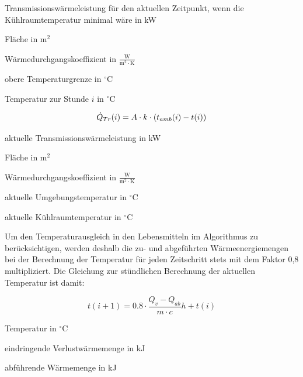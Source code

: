 \begin{description}[\dth]

	\item[$\ptransm(i)$] Transmissionswärmeleistung f\"ur den aktuellen
	Zeitpunkt, wenn die K\"uhlraumtemperatur minimal w\"are in kW
	\item[$A$] Fläche in $\mathrm{m^2}$
	\item[$k$] Wärmedurchgangskoeffizient in $\mathrm{\frac{W}{m^2 \cdot
	K}}$
	\item[$t_{max}$] obere Temperaturgrenze in $ ^{\circ} $C
	\item[$t(i)$] Temperatur zur Stunde $i$ in $ ^{\circ} $C
\end{description}
\vspace{0.5cm}

\begin{equation}
	\ptrans(i) = A \cdot k \cdot \left( t_{amb}(i) -
	t(i) \right)
	\label{ptransi}
\end{equation}

\begin{description}[\dth]

	\item[$\ptrans(i)$] aktuelle Transmissionswärmeleistung in kW
	\item[$A$] Fläche in $\mathrm{m^2}$
	\item[$k$] Wärmedurchgangskoeffizient in $\mathrm{\frac{W}{m^2 \cdot
	K}}$
	\item[$t_{amb}(i)$] aktuelle Umgebungstemperatur in $^{\circ}$C
	\item[$t(i)$] aktuelle Kühlraumtemperatur in $^{\circ}$C
\end{description}
\vspace{0.5cm}

Um den Temperaturausgleich in den Lebensmitteln im Algorithmus zu
berücksichtigen, werden deshalb die zu- und abgeführten Wärmeenergiemengen bei
der Berechnung der Temperatur für jeden Zeitschritt stets mit dem Faktor 0,8
multipliziert.  Die Gleichung zur stündlichen Berechnung der aktuellen
Temperatur ist damit:

\begin{equation}
	t(i+1) = 0.8 \cdot \frac{Q_v - Q_{ab}}{m \cdot c}h + t(i)
\label{tns}
\end{equation}

\begin{description}[\dth]

	\item[$t$] Temperatur in $^{\circ} $C
	\item[$Q_v$] eindringende Verlustwärmemenge in kJ
	\item[$Q_{ab}$] abführende Wärmemenge in kJ

\end{description}
\vspace{0.5cm}

